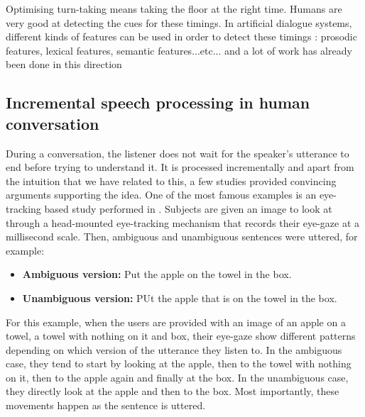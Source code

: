         Optimising turn-taking means taking the floor at the right time. Humans are very good at detecting the cues for these timings. In artificial dialogue systems, different kinds of features can be used in order to detect these timings \cite{Gravano2011}: prosodic features, lexical features, semantic features...etc... and a lot of work has already been done in this direction \cite{Meena2013} 
        
				
	\subsection{Incremental speech processing in human conversation}
	

           During a conversation, the listener does not wait for the speaker's utterance to end before trying to understand it. It is processed incrementally and apart from the intuition that we have related to this, a few studies provided convincing arguments supporting the idea. One of the most famous examples is an eye-tracking based study performed in \cite{Tanenhaus1995}. Subjects are given an image to look at through a head-mounted eye-tracking mechanism that records their eye-gaze at a millisecond scale. Then, ambiguous and unambiguous sentences were uttered, for example:

           \begin{itemize}
             \item \textbf{Ambiguous version:} Put the apple on the towel in the box.
             \item \textbf{Unambiguous version:} PUt the apple that is on the towel in the box.
           \end{itemize}

           For this example, when the users are provided with an image of an apple on a towel, a towel with nothing on it and box, their eye-gaze show different patterns depending on which version of the utterance they listen to. In the ambiguous case, they tend to start by looking at the apple, then to the towel with nothing on it, then to the apple again and finally at the box. In the unambiguous case, they directly look at the apple and then to the box. Most importantly, these movements happen as the sentence is uttered.

